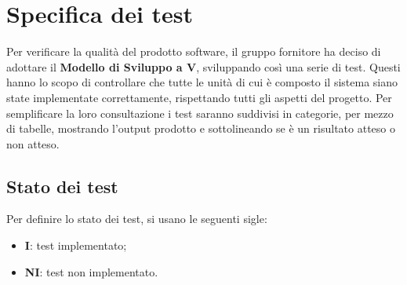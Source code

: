 \section{Specifica dei test}
Per verificare la qualità del prodotto software, il gruppo fornitore ha deciso di adottare il \textbf{Modello di Sviluppo a V}\glo, sviluppando così una serie di test. Questi hanno lo scopo di controllare che tutte le unità di cui è composto il sistema siano state implementate correttamente, rispettando tutti gli aspetti del progetto.
Per semplificare la loro consultazione i test saranno suddivisi in categorie, per mezzo di tabelle, mostrando l'output prodotto e sottolineando se è un risultato atteso o non atteso.
\subsection{Stato dei test}
Per definire lo stato dei test, si usano le seguenti sigle:
\begin{itemize}
\item \textbf{I}: test implementato;
\item \textbf{NI}: test non implementato.
\end{itemize}

